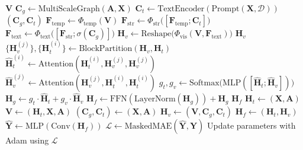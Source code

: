 \begin{algorithm}[H]
\begin{algorithmic}[1]
        \RETURN $\mathbf{V}$
        \STATE $\mathbf{C}_g\leftarrow\text{MultiScaleGraph}(\mathbf{A},\mathbf{X})$
        \STATE $\mathbf{C}_t\leftarrow\text{TextEncoder}(\text{Prompt}(\mathbf{X},\mathcal{D}))$
        \RETURN $(\mathbf{C}_g,\mathbf{C}_t)$
        \STATE $\mathbf{F}_{\text{temp}}\leftarrow\Phi_{\text{temp}}(\mathbf{V})$
        \STATE $\mathbf{F}_{\text{str}}\leftarrow\Phi_{\text{str}}\bigl([\mathbf{F}_{\text{temp}};\mathbf{C}_t]\bigr)$
        \STATE $\mathbf{F}_{\text{text}}\leftarrow\Phi_{\text{text}}\bigl([\mathbf{F}_{\text{str}};\sigma(\mathbf{C}_g)]\bigr)$
        \STATE $\mathbf{H}_v\leftarrow\text{Reshape}\!\bigl(\Phi_{\text{vis}}(\mathbf{V},\mathbf{F}_{\text{text}})\bigr)$
        \RETURN $\mathbf{H}_v$
        \STATE $\{\mathbf{H}_v^{(j)}\}, \{\mathbf{H}_t^{(i)}\} \leftarrow\text{BlockPartition}(\mathbf{H}_v,\mathbf{H}_t)$
            \STATE $\widehat{\mathbf{H}}_t^{(i)}\leftarrow\text{Attention}(
\mathbf{H}_t^{(i)},\mathbf{H}_v^{(j)},\mathbf{H}_v^{(j)})$
            \STATE $\widehat{\mathbf{H}}_v^{(j)}\leftarrow\text{Attention}(                   \mathbf{H}_v^{(j)},\mathbf{H}_t^{(i)},\mathbf{H}_t^{(i)})$
        \ENDFOR
        \STATE $g_t,g_v\leftarrow\text{Softmax}\bigl(\text{MLP}([\widehat{\mathbf{H}}_t;\widehat{\mathbf{H}}_v])\bigr)$
        \STATE $\mathbf{H}_g\leftarrow g_t\!\cdot\!\widehat{\mathbf{H}}_t
                      + g_v\!\cdot\!\widehat{\mathbf{H}}_v$
        \STATE $\mathbf{H}_f\leftarrow\text{FFN}(\text{LayerNorm}(\mathbf{H}_g))+\mathbf{H}_g$
        \RETURN $\mathbf{H}_f$
        \STATE $\mathbf{H}_t\leftarrow$$(\mathbf{X},\mathbf{A})$
        \STATE $\mathbf{V}\leftarrow$$(\mathbf{H}_t,\mathbf{X},\mathbf{A})$
        \STATE $(\mathbf{C}_g,\mathbf{C}_t)\leftarrow$$(\mathbf{X},\mathbf{A})$
        \STATE $\mathbf{H}_v\leftarrow$$(\mathbf{V},\mathbf{C}_g,\mathbf{C}_t)$
        \STATE $\mathbf{H}_f\leftarrow$$(\mathbf{H}_t,\mathbf{H}_v)$
        \STATE $\widehat{\mathbf{Y}}\leftarrow\text{MLP}(\text{Conv}(\mathbf{H}_f))$
        \STATE $\mathcal L\leftarrow\text{MaskedMAE}(\widehat{\mathbf{Y}},\mathbf{Y})$
        \STATE Update parameters with Adam using $\mathcal L$
    \ENDFOR
\end{algorithmic}
\end{algorithm}
